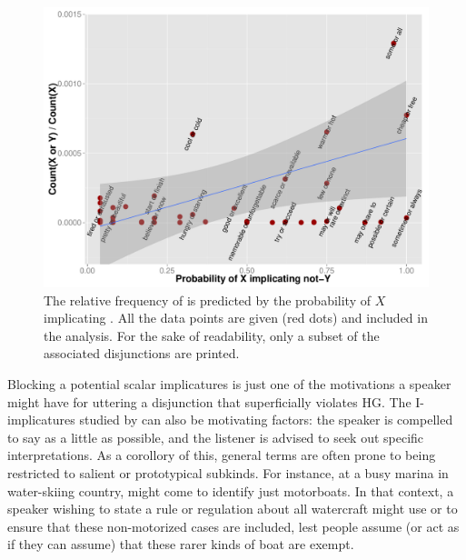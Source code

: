 \documentclass{article}
\begin{document}
\begin{figure}[tp]
  \centering
  \includegraphics[width=1\textwidth]{fig/disjunction-and-implicature}
  \caption{The relative frequency of  is predicted by the
    probability of $X$ implicating .  All the data points
    are given (red dots) and included in the analysis. For the sake of
    readability, only a subset of the associated disjunctions are
    printed.}
  \label{fig:chemla}
\end{figure}

Blocking a potential scalar implicatures is just one of the
motivations a speaker might have for uttering a disjunction that
superficially violates HG. The I-implicatures studied by
\citet{Levinson00} can also be motivating factors: the speaker is
compelled to say as a little as possible, and the listener is advised
to seek out specific interpretations. As a corollory of this, general
terms are often prone to being restricted to salient or prototypical
subkinds. For instance, at a busy marina in water-skiing country,
 might come to identify just motorboats. In that context, a
speaker wishing to state a rule or regulation about all watercraft
might use  or  to ensure that
these non-motorized cases are included, lest people assume (or act as
if they can assume) that these rarer kinds of boat are exempt.

\end{document}
